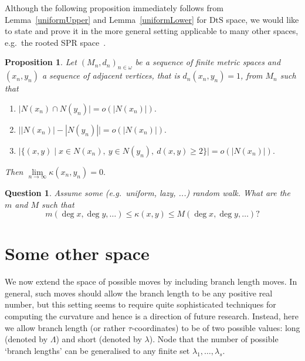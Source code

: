 \documentclass{amsart}
\newtheorem{question}{Question}
\newtheorem{proposition}{Proposition}
\newcommand{\dts}{\mathrm{DtS}}
\begin{document}
Although the following proposition immediately follows from 
Lemma~\ref{uniformUpper} and Lemma~\ref{uniformLower} for $\dts$ space,
we would like to state and prove it in the more general setting applicable 
to many other spaces, e.g.\ the rooted SPR space~\cite{Whidden2015-es}. 

\begin{proposition}
Let $(M_n,d_n)_{n \in \omega}$ be a sequence of finite metric spaces and 
$(x_n, y_n)$ a sequence of adjacent vertices, that is $d_n(x_n,y_n) = 1$,
from $M_n$ such that
\begin{enumerate}[(1)]
\item $\big|N(x_n) \cap N(y_n)\big| = o(|N(x_n)|).$ 
\item $\big||N(x_n)| - |N(y_n)|\big| = o(|N(x_n)|).$ 
\item $\big|\{(x,y) \mid x \in N(x_n),~ y \in N(y_n),~ d(x, y) \geq 2\}\big| 
= o(|N(x_n)|).$
\end{enumerate}

Then $\lim\limits_{n \to \infty} \kappa(x_n, y_n) = 0.$
\end{proposition}

\proof

\endproof

\begin{question}
Assume some (e.g.\ uniform, lazy, ...) random walk. What are the $m$ and $M$ 
such that 
\[
m(\deg x,\deg y, \ldots) \leq \kappa(x,y) \leq M(\deg x, \deg y, \ldots)? 
\]
\end{question}

\section{Some other space}

We now extend the space of possible moves by including branch length moves. 
In general, such moves should allow the branch length to be any positive real 
number, but this setting seems to require quite sophisticated techniques for 
computing the curvature and hence is a direction of future research. 
Instead, here we allow branch length (or rather $\tau$-coordinates) 
to be of two possible values: long (denoted by $\Lambda$) and short (denoted 
by $\lambda$). Node that the number of possible `branch lengths' can be 
generalised to any finite set $\lambda_1,\ldots,\lambda_s$.
\end{document}
